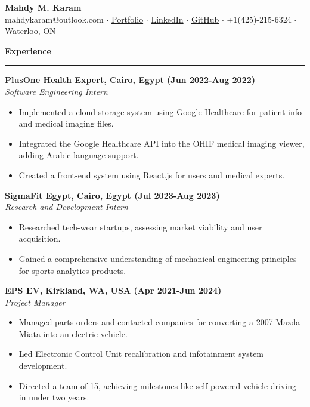 \documentclass[11pt]{article}
\begin{document}
\begin{center}
    {\LARGE \textbf{Mahdy M. Karam}} \\[0.25em]
    \normalsize
    mahdykaram@outlook.com $ \cdot $ 
    \href{https://mmkaram.github.io}{Portfolio} $ \cdot $ 
    \href{https://www.linkedin.com/in/mahdykaram}{LinkedIn} $ \cdot $ 
    \href{https://github.com/mmkaram}{GitHub} $ \cdot $
    +1(425)-215-6324 $ \cdot $ Waterloo, ON
\end{center}

\vspace{-0.75em}
\noindent
\textbf{Experience} \\
\rule{\textwidth}{0.5pt}

\textbf{PlusOne Health Expert, Cairo, Egypt (Jun 2022-Aug 2022)} \\
\textit{Software Engineering Intern}
\begin{itemize}
    \item Implemented a cloud storage system using Google Healthcare for patient info and medical imaging files.
    \item Integrated the Google Healthcare API into the OHIF medical imaging viewer, adding Arabic language support.
    \item Created a front-end system using React.js for users and medical experts.
\end{itemize}

\textbf{SigmaFit Egypt, Cairo, Egypt (Jul 2023-Aug 2023)} \\
\textit{Research and Development Intern}
\begin{itemize}
    \item Researched tech-wear startups, assessing market viability and user acquisition.
    \item Gained a comprehensive understanding of mechanical engineering principles for sports analytics products.
\end{itemize}

\textbf{EPS EV, Kirkland, WA, USA (Apr 2021-Jun 2024)} \\
\textit{Project Manager}
\begin{itemize}
    \item Managed parts orders and contacted companies for converting a 2007 Mazda Miata into an electric vehicle.
    \item Led Electronic Control Unit recalibration and infotainment system development.
    \item Directed a team of 15, achieving milestones like self-powered vehicle driving in under two years.
\end{itemize}
\end{document}
